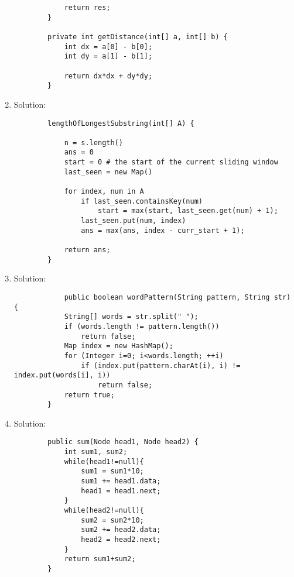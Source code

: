 \documentclass{article}
\begin{document}
\begin{enumerate}
\begin{lstlisting}
            return res;
        }

        private int getDistance(int[] a, int[] b) {
            int dx = a[0] - b[0];
            int dy = a[1] - b[1];

            return dx*dx + dy*dy;
        }

        \end{lstlisting}

        \item Solution:
        \begin{lstlisting}
        lengthOfLongestSubstring(int[] A) {

            n = s.length()
            ans = 0
            start = 0 # the start of the current sliding window
            last_seen = new Map()

            for index, num in A
                if last_seen.containsKey(num)
                    start = max(start, last_seen.get(num) + 1);
                last_seen.put(num, index)
                ans = max(ans, index - curr_start + 1);

            return ans;
        }
        \end{lstlisting}

        \item Solution:
        \begin{lstlisting}
            public boolean wordPattern(String pattern, String str) {
            String[] words = str.split(" ");
            if (words.length != pattern.length())
                return false;
            Map index = new HashMap();
            for (Integer i=0; i<words.length; ++i)
                if (index.put(pattern.charAt(i), i) != index.put(words[i], i))
                    return false;
            return true;
        }
        \end{lstlisting}

        \item Solution:
        \begin{lstlisting}
        public sum(Node head1, Node head2) {
            int sum1, sum2;
            while(head1!=null){
                sum1 = sum1*10;
                sum1 += head1.data;
                head1 = head1.next;
            }
            while(head2!=null){
                sum2 = sum2*10;
                sum2 += head2.data;
                head2 = head2.next;
            }
            return sum1+sum2;
        }
        \end{lstlisting}

    \end{enumerate}
\end{document}
